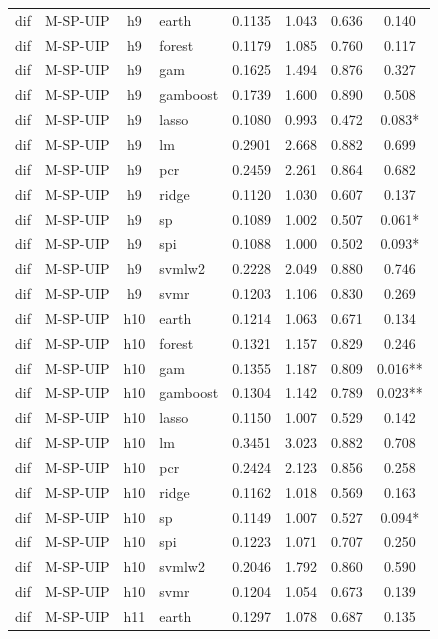 \begin{ThreePartTable}
\begin{longtable}[t]{llclcccc}
\addlinespace
dif & M-SP-UIP & h9 & earth & 0.1135 & 1.043 & 0.636 & 0.140\\
dif & M-SP-UIP & h9 & forest & 0.1179 & 1.085 & 0.760 & 0.117\\
dif & M-SP-UIP & h9 & gam & 0.1625 & 1.494 & 0.876 & 0.327\\
dif & M-SP-UIP & h9 & gamboost & 0.1739 & 1.600 & 0.890 & 0.508\\
dif & M-SP-UIP & h9 & lasso & 0.1080 & 0.993 & 0.472 & 0.083*\\
dif & M-SP-UIP & h9 & lm & 0.2901 & 2.668 & 0.882 & 0.699\\
dif & M-SP-UIP & h9 & pcr & 0.2459 & 2.261 & 0.864 & 0.682\\
dif & M-SP-UIP & h9 & ridge & 0.1120 & 1.030 & 0.607 & 0.137\\
dif & M-SP-UIP & h9 & sp & 0.1089 & 1.002 & 0.507 & 0.061*\\
dif & M-SP-UIP & h9 & spi & 0.1088 & 1.000 & 0.502 & 0.093*\\
dif & M-SP-UIP & h9 & svmlw2 & 0.2228 & 2.049 & 0.880 & 0.746\\
dif & M-SP-UIP & h9 & svmr & 0.1203 & 1.106 & 0.830 & 0.269\\
\addlinespace
dif & M-SP-UIP & h10 & earth & 0.1214 & 1.063 & 0.671 & 0.134\\
dif & M-SP-UIP & h10 & forest & 0.1321 & 1.157 & 0.829 & 0.246\\
dif & M-SP-UIP & h10 & gam & 0.1355 & 1.187 & 0.809 & 0.016**\\
dif & M-SP-UIP & h10 & gamboost & 0.1304 & 1.142 & 0.789 & 0.023**\\
dif & M-SP-UIP & h10 & lasso & 0.1150 & 1.007 & 0.529 & 0.142\\
dif & M-SP-UIP & h10 & lm & 0.3451 & 3.023 & 0.882 & 0.708\\
dif & M-SP-UIP & h10 & pcr & 0.2424 & 2.123 & 0.856 & 0.258\\
dif & M-SP-UIP & h10 & ridge & 0.1162 & 1.018 & 0.569 & 0.163\\
dif & M-SP-UIP & h10 & sp & 0.1149 & 1.007 & 0.527 & 0.094*\\
dif & M-SP-UIP & h10 & spi & 0.1223 & 1.071 & 0.707 & 0.250\\
dif & M-SP-UIP & h10 & svmlw2 & 0.2046 & 1.792 & 0.860 & 0.590\\
dif & M-SP-UIP & h10 & svmr & 0.1204 & 1.054 & 0.673 & 0.139\\
\addlinespace
dif & M-SP-UIP & h11 & earth & 0.1297 & 1.078 & 0.687 & 0.135\\

\end{longtable}
\end{ThreePartTable}

